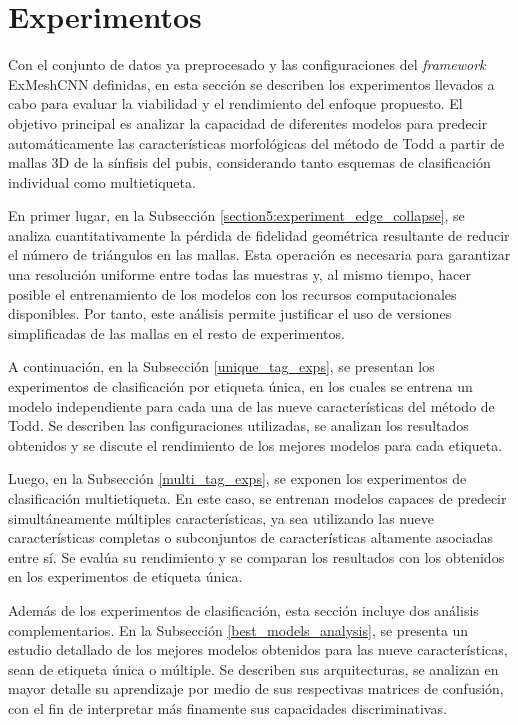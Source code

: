 \section{Experimentos}
Con el conjunto de datos ya preprocesado y las configuraciones del \textit{framework} ExMeshCNN definidas, en esta sección se describen los experimentos llevados a cabo para evaluar la viabilidad y el rendimiento del enfoque propuesto. El objetivo principal es analizar la capacidad de diferentes modelos para predecir automáticamente las características morfológicas del método de Todd a partir de mallas 3D de la sínfisis del pubis, considerando tanto esquemas de clasificación individual como multietiqueta.

En primer lugar, en la Subsección \ref{section5:experiment_edge_collapse}, se analiza cuantitativamente la pérdida de fidelidad geométrica resultante de reducir el número de triángulos en las mallas. Esta operación es necesaria para garantizar una resolución uniforme entre todas las muestras y, al mismo tiempo, hacer posible el entrenamiento de los modelos con los recursos computacionales disponibles. Por tanto, este análisis permite justificar el uso de versiones simplificadas de las mallas en el resto de experimentos.

A continuación, en la Subsección \ref{unique_tag_exps}, se presentan los experimentos de clasificación por etiqueta única, en los cuales se entrena un modelo independiente para cada una de las nueve características del método de Todd. Se describen las configuraciones utilizadas, se analizan los resultados obtenidos y se discute el rendimiento de los mejores modelos para cada etiqueta.

Luego, en la Subsección \ref{multi_tag_exps}, se exponen los experimentos de clasificación multietiqueta. En este caso, se entrenan modelos capaces de predecir simultáneamente múltiples características, ya sea utilizando las nueve características completas o subconjuntos de características altamente asociadas entre sí. Se evalúa su rendimiento y se comparan los resultados con los obtenidos en los experimentos de etiqueta única.

Además de los experimentos de clasificación, esta sección incluye dos análisis complementarios. En la Subsección \ref{best_models_analysis}, se presenta un estudio detallado de los mejores modelos obtenidos para las nueve características, sean de etiqueta única o múltiple. Se describen sus arquitecturas, se analizan en mayor detalle su aprendizaje por medio de sus respectivas matrices de confusión, con el fin de interpretar más finamente sus capacidades discriminativas.

